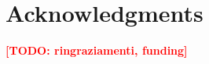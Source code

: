 \documentclass[conference]{IEEEtran}
\newcommand{\todo}[1]{\textcolor{red}{\textbf{[TODO: #1]}}}
\begin{document}
\section*{Acknowledgments}
\todo{ringraziamenti, funding}



\end{document}
